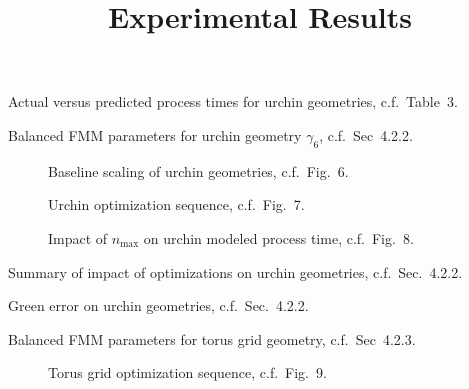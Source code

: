 \documentclass{article}
\title{Experimental Results}
\newcommand{\nmax}{n_{\textrm{max}}}
\newenvironment{resultstable}
               {
                 \begin{table}
                   \renewrobustcmd{\bfseries}{\fontseries{b}\selectfont}
               }
               {
                 \end{table}
               }
\begin{document}
\maketitle
\listoftables
\listoffigures

\begin{resultstable}
  \centering
  \caption{Actual versus predicted process times for urchin geometries, c.f.\ Table~3.}
  
\end{resultstable}

\begin{resultstable}
  \centering
  \caption{Balanced FMM parameters for urchin geometry $\gamma_6$, c.f.\ Sec~4.2.2.}
  
\end{resultstable}

\begin{figure}
  \centering
  
  \caption{Baseline scaling of urchin geometries, c.f.\ Fig.~6.}
\end{figure}

\begin{figure}
  \centering
  
  \caption{Urchin optimization sequence, c.f.\ Fig.~7.}
\end{figure}

\begin{figure}
  \centering
  
  \caption{Impact of $\nmax$ on urchin modeled process time, c.f.\ Fig.~8.}
\end{figure}

\begin{resultstable}
  \centering
  \caption{Summary of impact of optimizations on urchin geometries, c.f.\ Sec.~4.2.2.}
    
\end{resultstable}

\begin{resultstable}
  \centering
  \caption{Green error on urchin geometries, c.f.\ Sec.~4.2.2.}
    
\end{resultstable}

\begin{resultstable}
  \centering
  \caption{Balanced FMM parameters for torus grid geometry, c.f.\ Sec~4.2.3.}
  
\end{resultstable}

\begin{figure}
  \centering
  
  \caption{Torus grid optimization sequence, c.f.\ Fig.~9.}
\end{figure}
\end{document}
